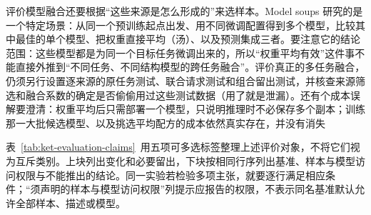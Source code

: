 \begin{samepage}
评价模型融合还要根据“这些来源是怎么形成的”来选样本。Model soups 研究的是一个特定场景：从同一个预训练起点出发、用不同微调配置得到多个模型，比较其中最佳的单个模型、把权重直接平均（汤）、以及预测集成三者。要注意它的结论范围：这些模型都是为同一个目标任务微调出来的，所以“权重平均有效”这件事不能直接外推到“不同任务、不同结构模型的跨任务融合”。评价真正的多任务融合，仍须另行设置逐来源的原任务测试、联合请求测试和组合留出测试，并核查来源筛选和融合系数的确定是否偷偷用过这些测试数据（用了就是泄漏）。还有个成本误解要澄清：权重平均后只需部署一个模型，只说明推理时不必保存多个副本；训练那一大批候选模型、以及挑选平均配方的成本依然真实存在，并没有消失

\end{samepage}

表~\ref{tab:ket-evaluation-claims}~用五项可多选标签整理上述评价对象，不将它们视为互斥类别。上块列出变化和必要留出，下块按相同行序列出基准、样本与模型访问权限与不能推出的结论。同一实验若检验多项主张，就要逐行满足相应条件；“须声明的样本与模型访问权限”列提示应报告的权限，不表示同名基准默认允许全部样本、描述或模型。

